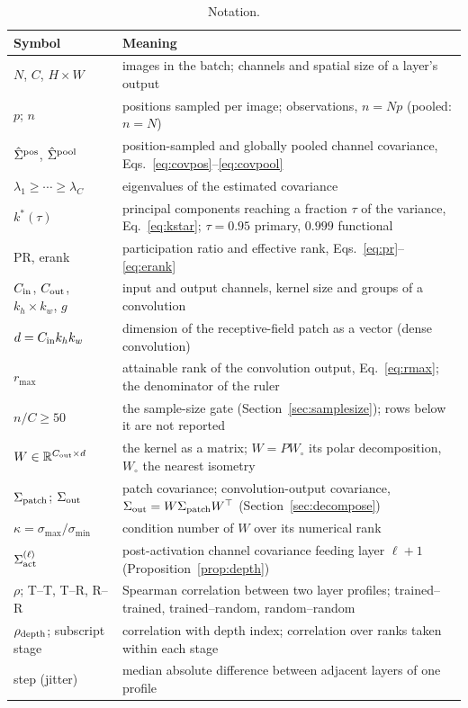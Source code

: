 \documentclass[10pt,journal,compsoc]{IEEEtran}
\begin{document}
\begin{table}[t]
  \caption{Notation.}
  \label{tab:notation}
  \centering
  \scriptsize
  \setlength{\tabcolsep}{3pt}
  \begin{tabular}{@{}>{\raggedright\arraybackslash}p{}>{\raggedright\arraybackslash}p{}@{}}
    \toprule
    Symbol & Meaning \\
    \midrule
    $N$, $C$, $H \times W$ & images in the batch; channels and spatial size of a layer's output \\
    $p$; $n$ & positions sampled per image; observations, $n = Np$ (pooled: $n = N$) \\
    $\hat{\Sigma}^{\rm pos}$, $\hat{\Sigma}^{\rm pool}$ & position-sampled and globally pooled channel covariance, Eqs.~\eqref{eq:covpos}--\eqref{eq:covpool} \\
    $\lambda_1 \ge \cdots \ge \lambda_C$ & eigenvalues of the estimated covariance \\
    $k^*(\tau)$ & principal components reaching a fraction $\tau$ of the variance, Eq.~\eqref{eq:kstar}; $\tau = 0.95$ primary, $0.999$ functional \\
    PR, erank & participation ratio and effective rank, Eqs.~\eqref{eq:pr}--\eqref{eq:erank} \\
    $C_{\rm in}$, $C_{\rm out}$, $k_h \times k_w$, $g$ & input and output channels, kernel size and groups of a convolution \\
    $d = C_{\rm in} k_h k_w$ & dimension of the receptive-field patch as a vector (dense convolution) \\
    $r_{\max}$ & attainable rank of the convolution output, Eq.~\eqref{eq:rmax}; the denominator of the ruler \\
    $n/C \ge 50$ & the sample-size gate (Section~\ref{sec:samplesize}); rows below it are not reported \\
    $W \in \mathbb{R}^{C_{\rm out} \times d}$ & the kernel as a matrix; $W = P W_{\circ}$ its polar decomposition, $W_{\circ}$ the nearest isometry \\
    $\Sigma_{\rm patch}$; $\Sigma_{\rm out}$ & patch covariance; convolution-output covariance, $\Sigma_{\rm out} = W \Sigma_{\rm patch} W^{\top}$ (Section~\ref{sec:decompose}) \\
    $\kappa = \sigma_{\max} / \sigma_{\min}$ & condition number of $W$ over its numerical rank \\
    $\Sigma_{\rm act}^{(\ell)}$ & post-activation channel covariance feeding layer $\ell + 1$ (Proposition~\ref{prop:depth}) \\
    $\rho$; T--T, T--R, R--R & Spearman correlation between two layer profiles; trained--trained, trained--random, random--random \\
    $\rho_{\rm depth}$; subscript stage & correlation with depth index; correlation over ranks taken within each stage \\
    step (jitter) & median absolute difference between adjacent layers of one profile \\
    \bottomrule
  \end{tabular}
\end{table}
\end{document}
